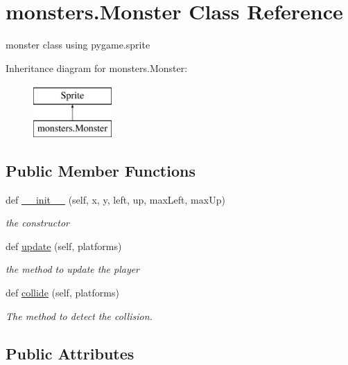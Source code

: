 \hypertarget{classmonsters_1_1_monster}{}\section{monsters.\+Monster Class Reference}
\label{classmonsters_1_1_monster}


monster class using pygame.\+sprite  


Inheritance diagram for monsters.\+Monster\+:\begin{figure}[H]
\begin{center}
\leavevmode
\includegraphics[height=2.000000cm]{classmonsters_1_1_monster}
\end{center}
\end{figure}
\subsection*{Public Member Functions}
\begin{DoxyCompactItemize}
\item 
def \hyperlink{classmonsters_1_1_monster_a1f5316617407345315db4e68c06bb47e}{\+\_\+\+\_\+init\+\_\+\+\_\+} (self, x, y, left, up, max\+Left, max\+Up)
\begin{DoxyCompactList}\small\item\em the constructor \end{DoxyCompactList}\item 
def \hyperlink{classmonsters_1_1_monster_ac7d656430724416cc27c6d7de71bb41c}{update} (self, platforms)
\begin{DoxyCompactList}\small\item\em the method to update the player \end{DoxyCompactList}\item 
def \hyperlink{classmonsters_1_1_monster_af428d784cccb907c0dab2537e68b3b3c}{collide} (self, platforms)
\begin{DoxyCompactList}\small\item\em The method to detect the collision. \end{DoxyCompactList}\end{DoxyCompactItemize}
\subsection*{Public Attributes}
\begin{DoxyCompactItemize}
\end{DoxyCompactItemize}


